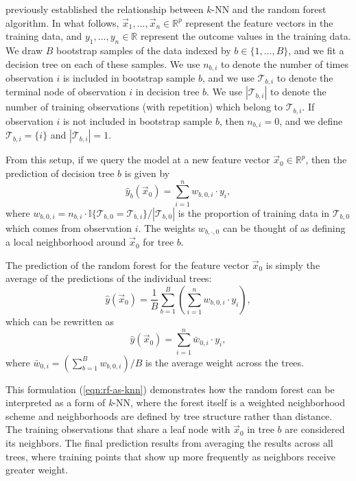 \documentclass{article}
\begin{document}
\textcite{lin_random_2006} previously established the relationship between $k$-NN and the random forest algorithm. In what follows, $\vec x_1, ..., \vec x_n \in \mathbb{R}^p$ represent the feature vectors in the training data, and $y_1, ..., y_n \in \mathbb{R}$ represent the outcome values in the training data. We draw $B$ bootstrap samples of the data indexed by $b \in \{1, ..., B\}$, and we fit a decision tree on each of these samples. We use $n_{b,i}$ to denote the number of times observation $i$ is included in bootstrap sample $b$, and we use $\mathcal{T}_{b,i}$ to denote the terminal node of observation $i$ in decision tree $b$. We use $|\mathcal{T}_{b,i}|$ to denote the number of training observations (with repetition) which belong to $\mathcal{T}_{b,i}$. If observation $i$ is not included in bootstrap sample $b$, then $n_{b,i} = 0$, and we define $\mathcal{T}_{b,i} = \{i\}$ and $|\mathcal{T}_{b,i}| = 1$.

From this setup, if we query the model at a new feature vector $\vec x_0 \in \mathbb{R}^p$, then the prediction of decision tree $b$ is given by
$$
  \hat{y}_b(\vec x_0) = \sum_{i = 1}^{n} w_{b,0,i} \cdot y_i,
$$
where $w_{b,0,i} = n_{b,i} \cdot \mathbb{I}\{\mathcal{T}_{b,0} = \mathcal{T}_{b,i}\} / |\mathcal{T}_{b,0}|$ is the proportion of training data in $\mathcal{T}_{b,0}$ which comes from observation $i$. The weights $w_{b,\cdot,0}$ can be thought of as defining a local neighborhood around $\vec x_0$ for tree $b$.

The prediction of the random forest for the feature vector $\vec x_0$ is simply the average of the predictions of the individual trees:
\begin{equation*}
  \hat{y}(\vec x_0) = \frac{1}{B} \sum_{b = 1}^B \left(\sum_{i = 1}^{n} w_{b,0,i} \cdot y_i\right),
\end{equation*}
which can be rewritten as
\begin{equation}
  \label{eqn:rf-as-knn}
  \hat{y}(\vec x_0) = \sum_{i = 1}^n \bar w_{0,i} \cdot y_i,
\end{equation}
where $\bar w_{0,i} = \left(\sum_{b = 1}^B w_{b,0,i}\right) / B$ is the average weight across the trees.

This formulation (\ref{eqn:rf-as-knn}) demonstrates how the random forest can be interpreted as a form of \textit{k}-NN, where the forest itself is a weighted neighborhood scheme and neighborhoods are defined by tree structure rather than distance. The training observations that share a leaf node with $\vec x_0$ in tree $b$ are considered its neighbors. The final prediction results from averaging the results across all trees, where training points that show up more frequently as neighbors receive greater weight.
\end{document}

